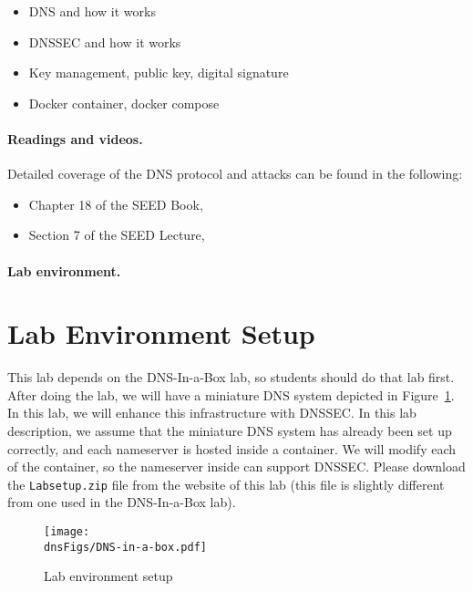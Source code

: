 \begin{itemize}[noitemsep]
\item DNS and how it works
\item DNSSEC and how it works
\item Key management, public key, digital signature 
\item Docker container, docker compose
\end{itemize}


\paragraph{Readings and videos.}
Detailed coverage of the DNS protocol and attacks can be found in the following:

\begin{itemize}
\item Chapter 18 of the SEED Book, \seedbook
\item Section 7 of the SEED Lecture, \seedisvideo
\end{itemize}


\paragraph{Lab environment.} 
\seedenvironmentB
\nodependency




\section{Lab Environment Setup} 


This lab depends on the DNS-In-a-Box lab, 
so students should do that lab first. After doing the lab,
we will have a miniature DNS system depicted in 
Figure~\ref{dnssec:fig:dns-in-a-box}. In this lab, we will
enhance this infrastructure with DNSSEC. 
In this lab description, we assume that the miniature DNS system 
has already been set up
correctly, and each nameserver is hosted inside a container. 
We will modify each of the container, so the nameserver inside 
can support DNSSEC. Please download the \texttt{Labsetup.zip}
file from the website of this lab (this file is slightly different 
from one used in the DNS-In-a-Box lab).


\begin{figure}[htb]
\begin{center}
\texttt{[image: \\dnsFigs/DNS-in-a-box.pdf]}
\end{center}
\caption{Lab environment setup}
\label{dnssec:fig:dns-in-a-box}
\end{figure}
 


